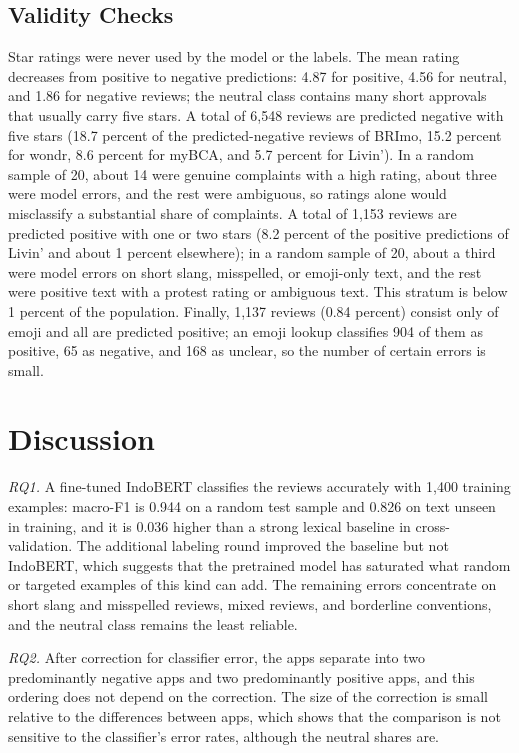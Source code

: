 \documentclass[conference]{IEEEtran}
\begin{document}
\subsection{Validity Checks}
Star ratings were never used by the model or the labels. The mean rating decreases from positive to negative predictions: 4.87 for positive, 4.56 for neutral, and 1.86 for negative reviews; the neutral class contains many short approvals that usually carry five stars. A total of 6,548 reviews are predicted negative with five stars (18.7 percent of the predicted-negative reviews of BRImo, 15.2 percent for wondr, 8.6 percent for myBCA, and 5.7 percent for Livin'). In a random sample of 20, about 14 were genuine complaints with a high rating, about three were model errors, and the rest were ambiguous, so ratings alone would misclassify a substantial share of complaints. A total of 1,153 reviews are predicted positive with one or two stars (8.2 percent of the positive predictions of Livin' and about 1 percent elsewhere); in a random sample of 20, about a third were model errors on short slang, misspelled, or emoji-only text, and the rest were positive text with a protest rating or ambiguous text. This stratum is below 1 percent of the population. Finally, 1,137 reviews (0.84 percent) consist only of emoji and all are predicted positive; an emoji lookup classifies 904 of them as positive, 65 as negative, and 168 as unclear, so the number of certain errors is small.

\section{Discussion}\label{sec:discussion}
\textit{RQ1.} A fine-tuned IndoBERT classifies the reviews accurately with 1,400 training examples: macro-F1 is 0.944 on a random test sample and 0.826 on text unseen in training, and it is 0.036 higher than a strong lexical baseline in cross-validation. The additional labeling round improved the baseline but not IndoBERT, which suggests that the pretrained model has saturated what random or targeted examples of this kind can add. The remaining errors concentrate on short slang and misspelled reviews, mixed reviews, and borderline conventions, and the neutral class remains the least reliable.

\textit{RQ2.} After correction for classifier error, the apps separate into two predominantly negative apps and two predominantly positive apps, and this ordering does not depend on the correction. The size of the correction is small relative to the differences between apps, which shows that the comparison is not sensitive to the classifier's error rates, although the neutral shares are.
\end{document}
